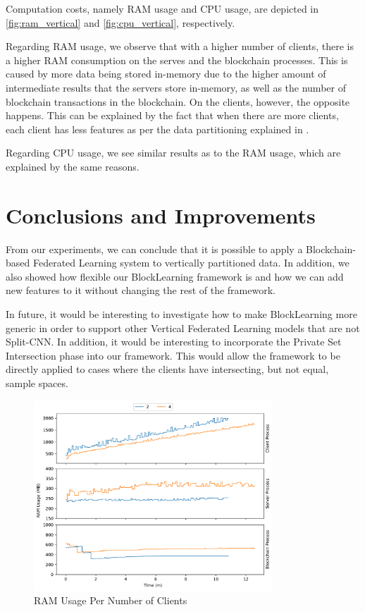 Computation costs, namely RAM usage and CPU usage, are depicted in \autoref{fig:ram_vertical} and \autoref{fig:cpu_vertical}, respectively.

Regarding RAM usage, we observe that with a higher number of clients, there is a higher RAM consumption on the serves and the blockchain processes. This is caused by more data being stored in-memory due to the higher amount of intermediate results that the servers store in-memory, as well as the number of blockchain transactions in the blockchain. On the clients, however, the opposite happens. This can be explained by the fact that when there are more clients, each client has less features as per the data partitioning explained in .

Regarding CPU usage, we see similar results as to the RAM usage, which are explained by the same reasons.

\section{Conclusions and Improvements}

From our experiments, we can conclude that it is possible to apply a Blockchain-based Federated Learning system to vertically partitioned data. In addition, we also showed how flexible our BlockLearning framework is and how we can add new features to it without changing the rest of the framework.

In future, it would be interesting to investigate how to make BlockLearning more generic in order to support other Vertical Federated Learning models that are not Split-CNN. In addition, it would be interesting to incorporate the Private Set Intersection phase into our framework. This would allow the framework to be directly applied to cases where the clients have intersecting, but not equal, sample spaces.

\clearpage

\begin{figure}[!hpt]
    \centering
    \centering
    \includegraphics[width=0.8\textwidth]{graphics/vertical/ram.pdf}
    \caption{RAM Usage Per Number of Clients}
    \label{fig:ram_vertical}
\end{figure}

